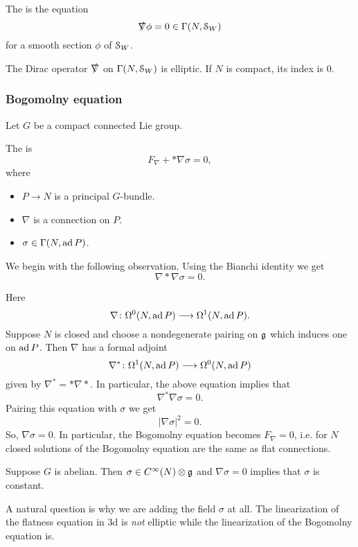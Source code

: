\begin{defn}
The  is the equation
\[\slashed{\nabla}\phi=0\in\Gamma(N, \mathcal{S}_W)\]
for a smooth section $\phi$ of $\mathcal{S}_W$.
\end{defn}

\begin{prop}
The Dirac operator $\slashed{\nabla}$ on $\Gamma(N, \mathcal{S}_W)$ is elliptic. If $N$ is compact, its index is $0$.
\end{prop}

\subsubsection{Bogomolny equation}

Let $G$ be a compact connected Lie group.

\begin{defn}
The  is
\[F_\nabla + \ast \nabla \sigma = 0,\]
where
\begin{itemize}
\item $P\rightarrow N$ is a principal $G$-bundle.
\item $\nabla$ is a connection on $P$.
\item $\sigma\in\Gamma(N, \operatorname{ad} P)$.
\end{itemize}
\end{defn}

We begin with the following observation. Using the Bianchi identity we get
\[\nabla \ast \nabla \sigma = 0.\]

Here
\[\nabla\colon\Omega^0(N, \operatorname{ad} P)\longrightarrow \Omega^1(N, \operatorname{ad} P).\]
Suppose $N$ is closed and choose a nondegenerate pairing on $\mathfrak{g}$ which induces one on $\operatorname{ad} P$. Then $\nabla$ has a formal adjoint
\[\nabla^*\colon \Omega^1(N, \operatorname{ad} P)\longrightarrow \Omega^0(N, \operatorname{ad} P)\]
given by $\nabla^* = \ast \nabla \ast$. In particular, the above equation implies that
\[\nabla^* \nabla \sigma = 0.\]
Pairing this equation with $\sigma$ we get
\[|\nabla \sigma|^2 = 0.\]
So, $\nabla \sigma = 0$. In particular, the Bogomolny equation becomes $F_\nabla = 0$, i.e. for $N$ closed solutions of the Bogomolny equation are the same as flat connections.

\begin{example}
Suppose $G$ is abelian. Then $\sigma\in C^\infty(N)\otimes \mathfrak{g}$ and $\nabla \sigma = 0$ implies that $\sigma$ is constant.
\end{example}

\begin{remark}
A natural question is why we are adding the field $\sigma$ at all. The linearization of the flatness equation in 3d is \emph{not} elliptic while the linearization of the Bogomolny equation is.
\end{remark}

